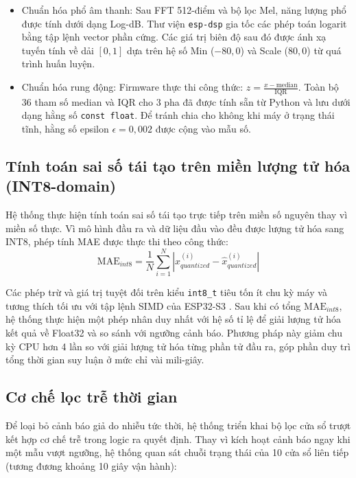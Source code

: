 \begin{itemize}
    \item Chuẩn hóa phổ âm thanh: Sau FFT 512-điểm và bộ lọc Mel, năng lượng phổ được tính dưới dạng Log-dB. Thư viện \texttt{esp-dsp} gia tốc các phép toán logarit bằng tập lệnh vector phần cứng. Các giá trị biên độ sau đó được ánh xạ tuyến tính về dải $[0, 1]$ dựa trên hệ số Min ($-80{,}0$) và Scale ($80{,}0$) từ quá trình huấn luyện.
    \item Chuẩn hóa rung động: Firmware thực thi công thức: $z = \frac{x - \text{median}}{\text{IQR}}$. Toàn bộ 36 tham số median và IQR cho 3 pha đã được tính sẵn từ Python và lưu dưới dạng hằng số \texttt{const float}. Để tránh chia cho không khi máy ở trạng thái tĩnh, hằng số epsilon $\epsilon = 0{,}002$ được cộng vào mẫu số.
\end{itemize}

\subsection{Tính toán sai số tái tạo trên miền lượng tử hóa (INT8-domain)}

Hệ thống thực hiện tính toán sai số tái tạo trực tiếp trên miền số nguyên thay vì miền số thực. Vì mô hình đầu ra và dữ liệu đầu vào đều được lượng tử hóa sang INT8, phép tính MAE được thực thi theo công thức:
\begin{equation}
    \text{MAE}_{int8} = \frac{1}{N} \sum_{i=1}^{N} \left| x_{quantized}^{(i)} - \hat{x}_{quantized}^{(i)} \right|
\end{equation}

Các phép trừ và giá trị tuyệt đối trên kiểu \texttt{int8\_t} tiêu tốn ít chu kỳ máy và tương thích tối ưu với tập lệnh SIMD của ESP32-S3 \cite{ref_1_15}. Sau khi có tổng $\text{MAE}_{int8}$, hệ thống thực hiện một phép nhân duy nhất với hệ số tỉ lệ để giải lượng tử hóa kết quả về Float32 và so sánh với ngưỡng cảnh báo. Phương pháp này giảm chu kỳ CPU hơn 4 lần so với giải lượng tử hóa từng phần tử đầu ra, góp phần duy trì tổng thời gian suy luận ở mức chỉ vài mili-giây.

\subsection{Cơ chế lọc trễ thời gian}
\label{subsec:temporal_debounce}

Để loại bỏ cảnh báo giả do nhiễu tức thời, hệ thống triển khai bộ lọc cửa sổ trượt kết hợp cơ chế trễ trong logic ra quyết định. Thay vì kích hoạt cảnh báo ngay khi một mẫu vượt ngưỡng, hệ thống quan sát chuỗi trạng thái của 10 cửa sổ liên tiếp (tương đương khoảng 10 giây vận hành):

